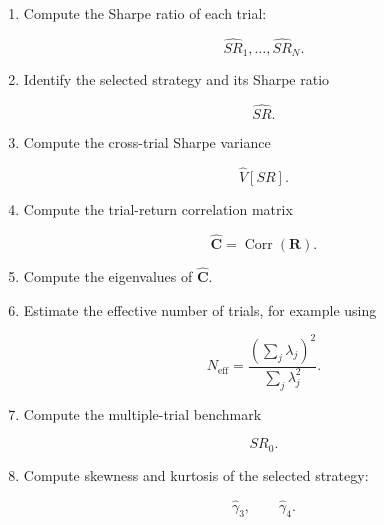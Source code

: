 \documentclass[11pt,a4paper]{article}
\begin{document}
\begin{enumerate}
    \item Compute the Sharpe ratio of each trial:
    
    \begin{equation}
    \widehat{SR}_1,\ldots,\widehat{SR}_N.
    \end{equation}
    
    \item Identify the selected strategy and its Sharpe ratio
    
    \begin{equation}
    \widehat{SR}.
    \end{equation}
    
    \item Compute the cross-trial Sharpe variance
    
    \begin{equation}
    \widehat{V}[SR].
    \end{equation}
    
    \item Compute the trial-return correlation matrix
    
    \begin{equation}
    \widehat{\mathbf{C}}
    =
    \operatorname{Corr}(\mathbf{R}).
    \end{equation}
    
    \item Compute the eigenvalues of $\widehat{\mathbf{C}}$.
    
    \item Estimate the effective number of trials, for example using
    
    \begin{equation}
    N_{\mathrm{eff}}
    =
    \frac{
    \left(\sum_j\lambda_j\right)^2
    }{
    \sum_j\lambda_j^2
    }.
    \end{equation}
    
    \item Compute the multiple-trial benchmark
    
    \begin{equation}
    SR_0.
    \end{equation}
    
    \item Compute skewness and kurtosis of the selected strategy:
    
    \begin{equation}
    \widehat{\gamma}_3,
    \qquad
    \widehat{\gamma}_4.
    \end{equation}
    

\end{enumerate}
\end{document}
